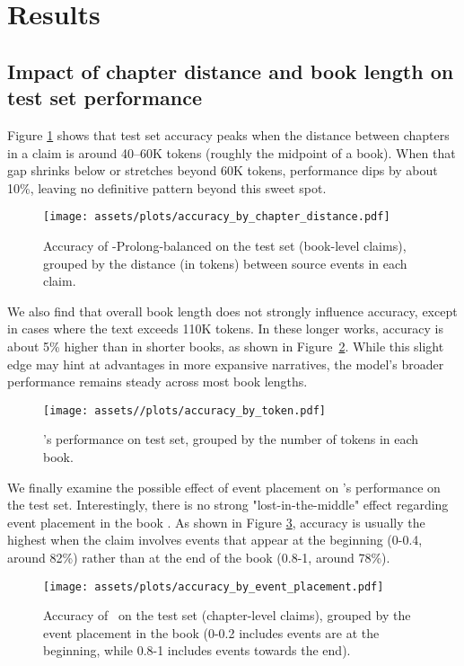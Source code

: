 \section{Results}
\subsection{Impact of chapter distance and book length on test set performance}
Figure \ref{fig:accuracy_chapter} shows that test set accuracy peaks when the distance between chapters in a claim is around 40--60K tokens (roughly the midpoint of a book). When that gap shrinks below or stretches beyond 60K tokens, performance dips by about 10\%, leaving no definitive pattern beyond this sweet spot.

\begin{figure}[htbp]
    \centering
    \texttt{[image: assets/plots/accuracy\_by\_chapter\_distance.pdf]}
    \caption{Accuracy of \pipeline-Prolong-balanced on the test set (book-level claims), grouped by the distance (in tokens) between source events in each claim.}
    \label{fig:accuracy_chapter}
\end{figure}


We also find that overall book length does not strongly influence accuracy, except in cases where the text exceeds 110K tokens. In these longer works, accuracy is about 5\% higher than in shorter books, as shown in Figure~\ref{fig:accuracy_book}. While this slight edge may hint at advantages in more expansive narratives, the model’s broader performance remains steady across most book lengths.

\begin{figure}[htbp]
    \centering
    \texttt{[image: assets//plots/accuracy\_by\_token.pdf]}
    \caption{\prolongftbalanced's performance on test set, grouped by the number of tokens in each book.}
    \label{fig:accuracy_book}
\end{figure}

We finally examine the possible effect of event placement on \prolongftbalanced's performance on the test set. Interestingly, there is no strong "lost-in-the-middle" effect regarding event placement in the book \cite{liu2024lost}. As shown in Figure \ref{fig:accuracy_event}, accuracy is usually the highest when the claim involves events that appear at the beginning (0-0.4, around 82\%) rather than at the end of the book (0.8-1, around 78\%). 

\begin{figure}[htbp]
    \centering
    \texttt{[image: assets/plots/accuracy\_by\_event\_placement.pdf]}
    \caption{Accuracy of \prolongftbalanced\ on the test set (chapter-level claims), grouped by the event placement in the book (0-0.2 includes events are at the beginning, while 0.8-1 includes events towards the end). }
    \label{fig:accuracy_event}
\end{figure}

